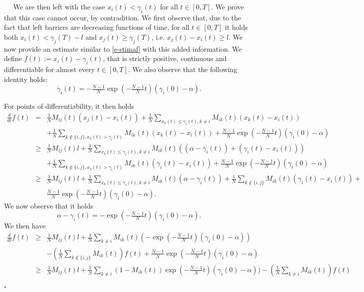 \documentclass[journal]{article}
\newenvironment{proof}{{\it Proof.}~~}{\hfill$\square$}
\begin{document}
\begin{proof}
We are then left with the case $x_i(t)< \gamma_i(t)$ for all $t\in[0,T]$. We prove that this case cannot occur, by contradition. We first observe that, due to the fact that left barriers are decreasing functions of time, for all $t\in[0,T]$ it holds both $x_i(t)< \gamma_j(T)-l$ and $x_j(t)\geq \gamma_j(T)$, i.e. $x_j(t)-x_i(t)\geq l$. We now provide an estimate similar to \eqref{e-stimaf} with this added information. We define $f(t):=x_i(t)-\gamma_i(t)$, that is strictly positive, continuous and differentiable for almost every $t\in[0,T]$. We also observe that the following identity holds:
$$\dot \gamma_i(t)=-\tfrac{N-1}{N}\exp(-\tfrac{N-1}{N}t)(\gamma_i(0)-\alpha).$$

 For points of differentiability, it then holds
\begin{eqnarray}
\frac{d}{dt} f(t)&=&\frac1N M_{ij}(t)(x_j(t)-x_i(t))+\frac1N \sum_{x_k(t) \leq \gamma_i(t),k\neq i} M_{ik}(t)(x_k(t)-x_i(t))\nonumber \\
& &+\frac1N \sum_{k\not\in\{ i,j\}, x_k(t)> \gamma_i(t)} M_{ik}(t)(x_k(t)-x_i(t))+\tfrac{N-1}{N}\exp(-\tfrac{N-1}{N}t)(\gamma_i(0)-\alpha)\nonumber \\
&\geq& \frac1N M_{ij}(t)l +\frac1N \sum_{x_k(t) \leq \gamma_i(t),k\neq i} M_{ik}(t)((\alpha-\gamma_i(t))+(\gamma_i(t)-x_i(t)))\nonumber \\
& &+\frac1N \sum_{k\not\in\{i, j\}, x_k(t)> \gamma_i(t)} M_{ik}(t)(\gamma_i(t)-x_i(t))+\tfrac{N-1}{N}\exp(-\tfrac{N-1}{N}t)(\gamma_i(0)-\alpha)\nonumber \\
&\geq& \frac1N M_{ij}(t)l +\frac1N \sum_{x_k(t) \leq \gamma_i(t),k\neq i} M_{ik}(t)(\alpha-\gamma_i(t))+\frac1N \sum_{k\not\in\{i, j\}} M_{ik}(t)(\gamma_i(t)-x_i(t))+\nonumber\\
&&\tfrac{N-1}{N}\exp(-\tfrac{N-1}{N}t)(\gamma_i(0)-\alpha).\nonumber 
\end{eqnarray}
We now observe that it holds $$\alpha-\gamma_i(t)= -\exp(-\tfrac{N-1}{N}t)(\gamma_i(0)-\alpha).$$ We then have 
\begin{eqnarray}
\frac{d}{dt} f(t)&\geq& \frac1N M_{ij}(t)l +\frac1N \sum_{k\neq i} M_{ik}(t)(-\exp(-\tfrac{N-1}{N}t)(\gamma_i(0)-\alpha)) \nonumber\\
&&-\left(\frac1N \sum_{k\not\in\{i, j\}} M_{ik}(t)\right) f(t) +\tfrac{N-1}{N}\exp(-\tfrac{N-1}{N}t)(\gamma_i(0)-\alpha)\nonumber\\
&\geq&\frac1N M_{ij}(t)l + \frac1N \sum_{k\neq i} (1-M_{ik}(t))\exp(-\tfrac{N-1}{N}t)(\gamma_i(0)-\alpha)) -\left(\frac1N \sum_{k\neq i} M_{ik}(t)\right) f(t)\nonumber\\

\end{eqnarray}
\end{proof}
\end{document}
